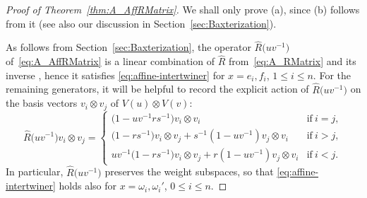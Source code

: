 \documentclass[pdftex]{sigma}
\numberwithin{equation}{section}
\begin{document}
\begin{proof}[Proof of Theorem~\ref{thm:A_AffRMatrix}]
We shall only prove (a), since (b) follows from it (see also our discussion in Section~\ref{sec:Baxterization}).

As follows from Section~\ref{sec:Baxterization}, the operator $\hat{R}\bigl(uv^{-1}\bigr)$ of~\eqref{eq:A_AffRMatrix} is a linear combination of $\hat{R}$ from~\eqref{eq:A_RMatrix} and its inverse , hence it satisfies \eqref{eq:affine-intertwiner} for $x = e_{i},f_{i}$, $1 \le i \le n$. For the remaining generators, it will be helpful to record the explicit action of $\hat{R}\bigl(uv^{-1}\bigr)$ on the basis vectors $v_{i} \otimes v_{j}$ of $V(u) \otimes V(v)$:
\begin{equation}\label{eq:R-action-A}
 \hat{R}\bigl(uv^{-1}\bigr) v_{i} \otimes v_{j} =
 \begin{cases}
 \bigl(1 - uv^{-1}rs^{-1}\bigr)v_{i} \otimes v_{i} & \text{if}\ i = j, \\
 \bigl(1 - rs^{-1}\bigr)v_{i} \otimes v_{j} + s^{-1}(1 - uv^{-1})v_{j} \otimes v_{i} & \text{if}\ i > j, \\
 uv^{-1}\bigl(1 - rs^{-1}\bigr)v_{i} \otimes v_{j} + r(1 - uv^{-1})v_{j} \otimes v_{i} & \text{if}\ i < j.
 \end{cases}
\end{equation}
In particular, $\hat{R}\bigl(uv^{-1}\bigr)$ preserves the weight subspaces, so that \eqref{eq:affine-intertwiner} holds also for $x = \omega_{i},\omega_{i}'$, $0 \le i \le n$.



\end{proof}
\end{document}
